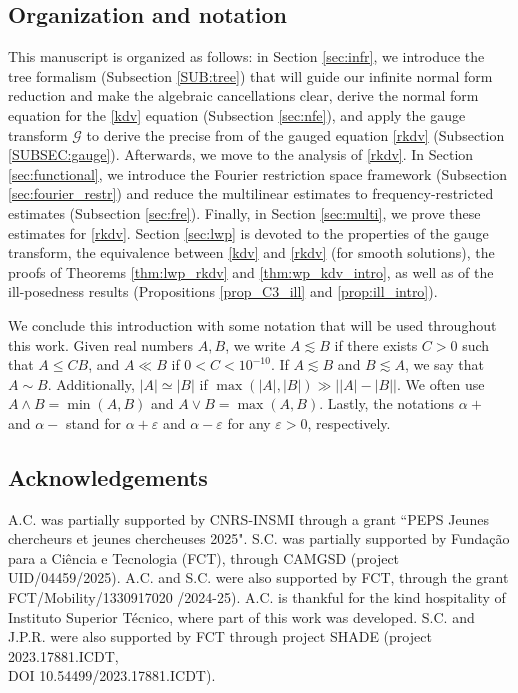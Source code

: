 \documentclass[a4paper,
11pt,  reqno]{amsart}
\newcommand{\5}{\textup{V}}
\newcommand{\les}{\lesssim}
\newcommand{\eps}{\varepsilon}
\theoremstyle{remark}
\newcommand{\al}{\alpha}
\newcommand{\Gc}{\mathcal{G}}
\numberwithin{equation}{section}
\numberwithin{theorem}{section}
\begin{document}
\subsection{Organization and notation} This manuscript is organized as follows: in Section \ref{sec:infr}, we introduce the tree formalism (Subsection \ref{SUB:tree}) that will guide our infinite normal form reduction and make the algebraic cancellations clear, derive the normal form equation for the \eqref{kdv} equation (Subsection \ref{sec:nfe}), and apply the gauge transform $\Gc$ to derive the precise from of the gauged equation \ref{rkdv} (Subsection \ref{SUBSEC:gauge}).
Afterwards, we move to the analysis of \eqref{rkdv}. In Section \ref{sec:functional}, we introduce the Fourier restriction space framework (Subsection \ref{sec:fourier_restr}) and reduce the multilinear estimates to frequency-restricted estimates (Subsection \ref{sec:fre}). Finally, in Section \ref{sec:multi}, we prove these estimates for \eqref{rkdv}. Section \ref{sec:lwp} is devoted to the properties of the gauge transform, the equivalence between \eqref{kdv} and \eqref{rkdv} (for smooth solutions), the proofs of Theorems \ref{thm:lwp_rkdv} and \ref{thm:wp_kdv_intro}, as well as of the ill-posedness results (Propositions \ref{prop_C3_ill} and \ref{prop:ill_intro}).

\bigskip

We conclude this introduction with some notation that will be used throughout this work. Given real numbers $A,B$, we write $A \les B$ if there exists $C>0$ such that $A \le CB$, and $A \ll B$ if $0<C< 10^{-10}$. If $A\les B$ and $B\les A$, we say that $A\sim B$. Additionally, $|A| \simeq |B|$ if $\max(|A|,|B|) \gg \big| |A| - |B| \big|$.
We often use $A \land B = \min(A,B)$ and $A \lor B = \max(A,B)$.
Lastly,
the notations $\al +$ and $\al-$ stand for $\al+\eps$ and $\al-\eps$ for any $\eps>0$, respectively.

\subsection{Acknowledgements} A.C. was partially supported by  CNRS-INSMI through a grant ``PEPS Jeunes chercheurs et jeunes chercheuses 2025". S.C. was partially supported by Funda\c{c}\~ao para a Ci\^encia e Tecnologia (FCT), through CAMGSD (project UID/04459/2025). A.C. and S.C. were also supported by FCT, through the grant FCT/Mobility/1330917020 /2024-25). A.C. is thankful for the kind hospitality of Instituto Superior Técnico, where part of this work was developed. S.C. and J.P.R. were also supported by FCT through project SHADE (project 2023.17881.ICDT, \\
DOI 10.54499/2023.17881.ICDT).
\end{document}
